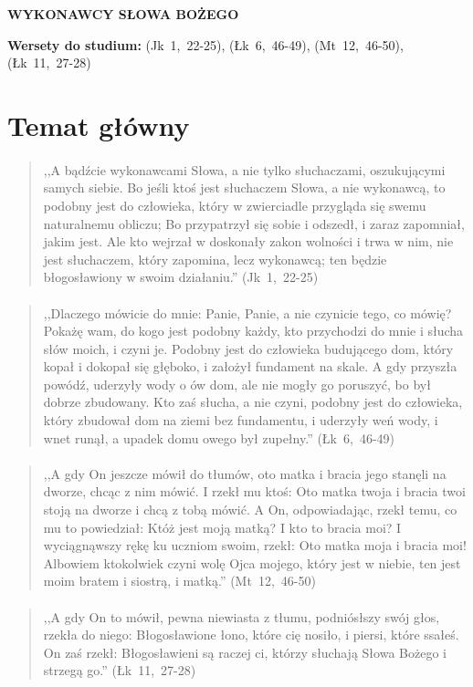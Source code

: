 \documentclass[10pt,a4paper,oneside]{article}
\begin{document}
\centerline{\textbf{\MakeUppercase{Wykonawcy Słowa Bożego}}}
\begin{center}
\textbf{Wersety do studium:} \mbox{(Jk 1, 22-25)}, \mbox{(Łk 6, 46-49)}, \mbox{(Mt 12, 46-50)}, \mbox{(Łk 11, 27-28)}
\end{center}
\section{Temat główny}
\paragraph{}
\begin{quote}
,,A bądźcie wykonawcami Słowa, a nie tylko słuchaczami, oszukującymi samych siebie. Bo jeśli ktoś jest słuchaczem Słowa, a nie wykonawcą, to podobny jest do człowieka, który w zwierciadle przygląda się swemu naturalnemu obliczu; Bo przypatrzył się sobie i odszedł, i zaraz zapomniał, jakim jest. Ale kto wejrzał w doskonały zakon wolności i trwa w nim, nie jest słuchaczem, który zapomina, lecz wykonawcą; ten będzie błogosławiony w swoim działaniu.'' \mbox{(Jk 1, 22-25)}
\end{quote}
\paragraph{}
\begin{quote}
,,Dlaczego mówicie do mnie: Panie, Panie, a nie czynicie tego, co mówię? Pokażę wam, do kogo jest podobny każdy, kto przychodzi do mnie i słucha słów moich, i czyni je. Podobny jest do człowieka budującego dom, który kopał i dokopał się głęboko, i założył fundament na skale. A gdy przyszła powódź, uderzyły wody o ów dom, ale nie mogły go poruszyć, bo był dobrze zbudowany. Kto zaś słucha, a nie czyni, podobny jest do człowieka, który zbudował dom na ziemi bez fundamentu, i uderzyły weń wody, i wnet runął, a upadek domu owego był zupełny.'' \mbox{(Łk 6, 46-49)}
\end{quote}
\paragraph{}
\begin{quote}
,,A gdy On jeszcze mówił do tłumów, oto matka i bracia jego stanęli na dworze, chcąc z nim mówić. I rzekł mu ktoś: Oto matka twoja i bracia twoi stoją na dworze i chcą z tobą mówić. A On, odpowiadając, rzekł temu, co mu to powiedział: Któż jest moją matką? I kto to bracia moi? I wyciągnąwszy rękę ku uczniom swoim, rzekł: Oto matka moja i bracia moi! Albowiem ktokolwiek czyni wolę Ojca mojego, który jest w niebie, ten jest moim bratem i siostrą, i matką.'' \mbox{(Mt 12, 46-50)}
\end{quote}
\paragraph{}
\begin{quote}
,,A gdy On to mówił, pewna niewiasta z tłumu, podniósłszy swój głos, rzekła do niego: Błogosławione łono, które cię nosiło, i piersi, które ssałeś. On zaś rzekł: Błogosławieni są raczej ci, którzy słuchają Słowa Bożego i strzegą go.'' \mbox{(Łk 11, 27-28)}
\end{quote}
\end{document}
